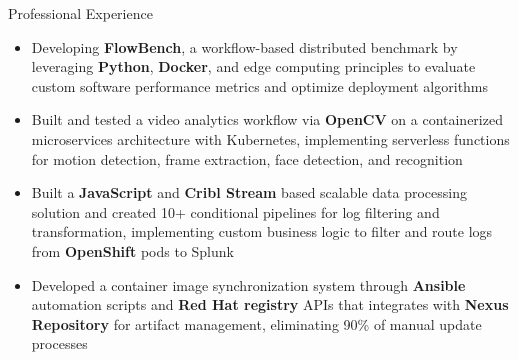 \documentclass{resume}
\begin{document}
    \begin{experienceSection}{Professional Experience}
    \experienceItem[
        company={Arizona State University},
        location={Tempe, AZ},
        position={Research Assistant, VISA Lab},
        duration={Jun 2025 - Present}
    ]
    \begin{itemize}
        \itemsep -6pt {}
        \item Developing \textbf{FlowBench}, a workflow-based distributed benchmark by leveraging \textbf{Python}, \textbf{Docker}, and edge computing principles to evaluate custom software performance metrics and optimize deployment algorithms
        \item Built and tested a video analytics workflow via \textbf{OpenCV} on a containerized microservices architecture with Kubernetes, implementing serverless functions for motion detection, frame extraction, face detection, and recognition
    \end{itemize}


    \experienceItem[
        company={Arch Mortgage Insurance},
        location={Greensboro, NC},
        position={Software Engineer Intern},
        duration={Jun 2024 - Aug 2024}
    ]
    \begin{itemize}
        \itemsep -6pt {}
        \item Built a \textbf{JavaScript} and \textbf{Cribl Stream} based scalable data processing solution and created 10+ conditional pipelines for log filtering and transformation, implementing custom business logic to filter and route logs from \textbf{OpenShift} pods to Splunk
        \item Developed a container image synchronization system through \textbf{Ansible} automation scripts and \textbf{Red Hat registry} APIs that integrates with \textbf{Nexus Repository} for artifact management, eliminating 90\% of manual update processes
        
    \end{itemize}


\end{experienceSection}
\end{document}
